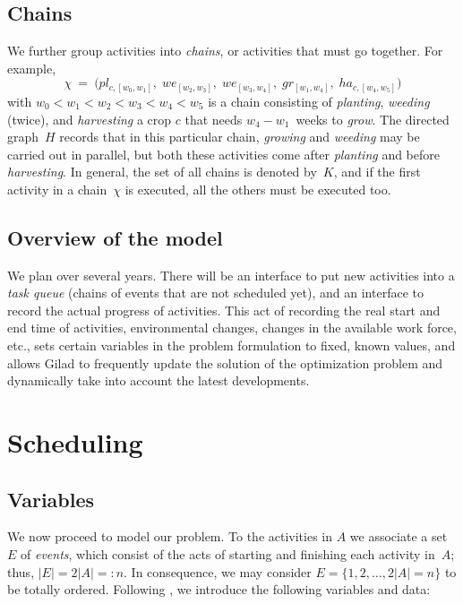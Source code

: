 \documentclass[11pt,reqno]{amsart}
\numberwithin{equation}{section}
\begin{document}
\subsection{Chains}
We further group activities into \emph{chains}, or activities that must go
together. For example,
\[
   \chi
   \ = \
   \big(pl_{c,[w_0,w_1]}, \;
    we_{[w_2,w_3]},\;
    we_{[w_3,w_4]},\;
    gr_{[w_1,w_4]},\;
    ha_{c,[w_4,w_5]}\big)
\]
with $w_0<w_1<w_2<w_3<w_4<w_5$ is a chain consisting of \emph{planting}, \emph{weeding}
(twice), and \emph{harvesting} a crop $c$ that needs $w_4-w_1$~weeks to \emph{grow}. The
directed graph~$H$ records that in this particular chain, \emph{growing} and
\emph{weeding} may be carried out in parallel, but both these activities come after
\emph{planting} and before \emph{harvesting}. In general, the set of all chains is denoted
by~$K$, and if the first activity in a chain~$\chi$ is executed, all the others must be
executed too.



\subsection{Overview of the model}

We plan over several years. There will be an interface to put new activities into a
\emph{task queue} (chains of events that are not scheduled yet), and an interface to
record the actual progress of activities. This act of recording the real start and end
time of activities, environmental changes, changes in the available work force, etc., sets
certain variables in the problem formulation to fixed, known values, and allows Gilad to
frequently update the solution of the optimization problem and dynamically take into
account the latest developments.

\section{Scheduling}

\subsection{Variables}

We now proceed to model our problem.  To the activities in $A$ we associate a set~$E$ of
\emph{events}, which consist of the acts of starting and finishing each activity in~$A$;
thus, $|E|=2|A|=:n$. In consequence, we may consider $E=\{1,2,\dots, 2|A|=n\}$ to be
totally ordered.  Following \cite{artigues-etal11}, we introduce the following variables
and data:
\end{document}
